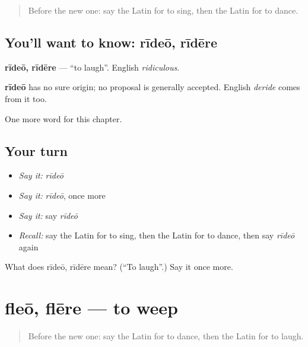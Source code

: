 \label{lesson:LA-C75-rideo}



\begin{quote}
Before the new one: say the Latin for to sing, then the Latin for to dance.
\end{quote}

\subsection*{You'll want to know: rīdeō, rīdēre}
\textbf{rīdeō, rīdēre} — \textquotedblleft{}to laugh\textquotedblright{}. English \emph{ridiculous}.

\begin{cousinweb}
\textbf{rīdeō} has no sure origin; no proposal is generally accepted. English \emph{deride} comes from it too.
\end{cousinweb}

\begin{grammarlens}[title={What you've built}]
One more word for this chapter.
\end{grammarlens}

\subsection*{Your turn}
\begin{itemize}
\raggedright
  \item \emph{Say it:} \emph{rīdeō}
  \item \emph{Say it:} \emph{rīdeō}, once more
  \item \emph{Say it:} say \emph{rīdeō}
  \item \emph{Recall:} say the Latin for to sing, then the Latin for to dance, then say \emph{rīdeō} again
\end{itemize}

\begin{tcolorbox}[breakable,colback=teal!4,colframe=teal!35!black,title={Before you move on}]
What does rīdeō, rīdēre mean? (\textquotedblleft{}To laugh\textquotedblright{}.) Say it once more.
\end{tcolorbox}
\section[fleō, flēre]{fleō, flēre — to weep}

\label{lesson:LA-C75-fleo}



\begin{quote}
Before the new one: say the Latin for to dance, then the Latin for to laugh.
\end{quote}


